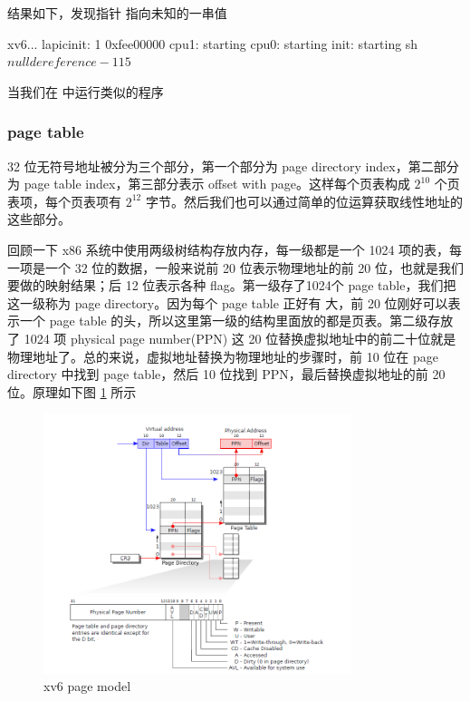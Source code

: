 结果如下，发现指针  指向未知的一串值

\begin{textcode}
    xv6...
    lapicinit: 1 0xfee00000
    cpu1: starting
    cpu0: starting
    init: starting sh
    $ nulldereference
    -115
    $ 
\end{textcode}

当我们在  中运行类似的程序


\subsubsection{page table}

32 位无符号地址被分为三个部分，第一个部分为 page directory index，第二部分为 page table index，第三部分表示 offset with page。这样每个页表构成 $2^{10}$ 个页表项，每个页表项有 $2^{12}$ 字节。然后我们也可以通过简单的位运算获取线性地址的这些部分。

回顾一下 x86 系统中使用两级树结构存放内存，每一级都是一个 1024 项的表，每一项是一个 32 位的数据，一般来说前 20 位表示物理地址的前 20 位，也就是我们要做的映射结果；后 12 位表示各种 flag。第一级存了1024个 page table，我们把这一级称为 page directory。因为每个 page table 正好有  大，前 20 位刚好可以表示一个 page table 的头，所以这里第一级的结构里面放的都是页表。第二级存放了 1024 项 physical page number(PPN) 这 20 位替换虚拟地址中的前二十位就是物理地址了。总的来说，虚拟地址替换为物理地址的步骤时，前 10 位在 page directory 中找到 page table，然后 10 位找到 PPN，最后替换虚拟地址的前 20 位。原理如下图 \ref{fig:1} 所示

\begin{figure}[h]
    \centering
    \includegraphics[width=0.8\textwidth]{img/pagemodel.PNG}
    \caption{xv6 page model}
    \label{fig:1}
\end{figure}

